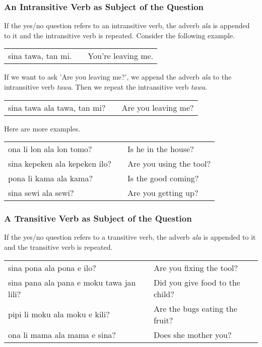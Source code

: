 \subsubsection*{An Intransitive Verb as Subject of the Question}
If the yes/no question refers to an intransitive verb, the adverb \textit{ala} is appended to it and the intransitive verb is repeated.
Consider the following example.

\begin{supertabular}{p{5,5cm}|ll}
    sina tawa, tan mi. &  & You're leaving me. \\
\end{supertabular}

If we want to ask 'Are you leaving me?', we append the adverb \textit{ala} to the intransitive verb \textit{tawa}.
Then we repeat the intransitive verb \textit{tawa}.

\begin{supertabular}{p{5,5cm}|ll}
    sina tawa ala tawa, tan mi? &  & Are you leaving me? \\
\end{supertabular}

Here are more examples.

\begin{supertabular}{p{5,5cm}|ll}
    ona li lon ala lon tomo?      &  & Is he in the house?     \\
    sina kepeken ala kepeken ilo? &  & Are you using the tool? \\
    pona li kama ala kama?        &  & Is the good coming?     \\
    sina sewi ala sewi?           &  & Are you getting up?     \\
\end{supertabular}

\subsubsection*{A Transitive Verb as Subject of the Question}
If the yes/no question refers to a transitive verb, the adverb \textit{ala} is appended to it and the transitive verb is repeated.

\begin{supertabular}{p{5,5cm}|ll}
    sina pona ala pona e ilo?                &  & Are you fixing the tool?        \\
    sina pana ala pana e moku tawa jan lili? &  & Did you give food to the child? \\
    pipi li moku ala moku e kili?            &  & Are the bugs eating the fruit?  \\
    ona li mama ala mama e sina?             &  & Does she mother you?            \\
\end{supertabular}

